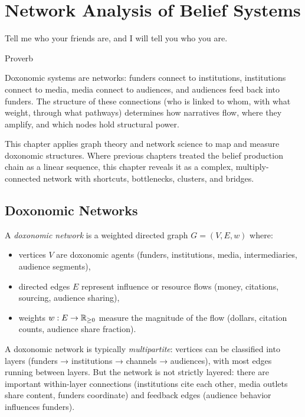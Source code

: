 \chapter{Network Analysis of Belief Systems}
\label{ch:network-analysis}

\epigraph{Tell me who your friends are, and I will tell you who you are.}{Proverb}

\noindent
Doxonomic systems are networks: funders connect to institutions, institutions connect to media, media connect to audiences, and audiences feed back into funders.
The structure of these connections (who is linked to whom, with what weight, through what pathways) determines how narratives flow, where they amplify, and which nodes hold structural power.

This chapter applies graph theory and network science to map and measure doxonomic structures.
Where previous chapters treated the belief production chain as a linear sequence, this chapter reveals it as a complex, multiply-connected network with shortcuts, bottlenecks, clusters, and bridges.


\section{Doxonomic Networks}
\label{sec:ch15-networks}

\begin{definition}
\label{def:doxonomic-network}
A \emph{doxonomic network} is a weighted directed graph $G = (V, E, w)$ where:
\begin{itemize}[nosep]
  \item vertices $V$ are doxonomic agents (funders, institutions, media, intermediaries, audience segments),
  \item directed edges $E$ represent influence or resource flows (money, citations, sourcing, audience sharing),
  \item weights $w: E \to \mathbb{R}_{\geq 0}$ measure the magnitude of the flow (dollars, citation counts, audience share fraction).
\end{itemize}
\end{definition}

A doxonomic network is typically \emph{multipartite}: vertices can be classified into layers (funders → institutions → channels → audiences), with most edges running between layers.
But the network is not strictly layered: there are important within-layer connections (institutions cite each other, media outlets share content, funders coordinate) and feedback edges (audience behavior influences funders).

